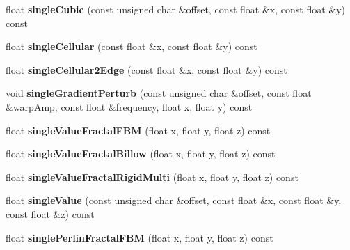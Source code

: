 \begin{DoxyCompactItemize}
\item 
\mbox{\label{classnoisefast_afbbb7524b3ad1ed5a73151118eda2a15}} 
float {\bfseries single\+Cubic} (const unsigned char \&offset, const float \&x, const float \&y) const
\item 
\mbox{\label{classnoisefast_a4ed28a5a64f23391bf7fc47a4e5c9406}} 
float {\bfseries single\+Cellular} (const float \&x, const float \&y) const
\item 
\mbox{\label{classnoisefast_a880c63b975569479b02e7a55e5c5abe5}} 
float {\bfseries single\+Cellular2\+Edge} (const float \&x, const float \&y) const
\item 
\mbox{\label{classnoisefast_ac940409687731590ca85d2a332ab571f}} 
void {\bfseries single\+Gradient\+Perturb} (const unsigned char \&offset, const float \&warp\+Amp, const float \&frequency, float x, float y) const
\item 
\mbox{\label{classnoisefast_a88653a808979753ae72ab4ef381f0c38}} 
float {\bfseries single\+Value\+Fractal\+F\+BM} (float x, float y, float z) const
\item 
\mbox{\label{classnoisefast_a1285f5ef689b8f554bbbf304e565dad2}} 
float {\bfseries single\+Value\+Fractal\+Billow} (float x, float y, float z) const
\item 
\mbox{\label{classnoisefast_af8271af4a3394316c42fc0db3f26ed74}} 
float {\bfseries single\+Value\+Fractal\+Rigid\+Multi} (float x, float y, float z) const
\item 
\mbox{\label{classnoisefast_a14a53e242b826300afd9f682310bd8d4}} 
float {\bfseries single\+Value} (const unsigned char \&offset, const float \&x, const float \&y, const float \&z) const
\item 
\mbox{\label{classnoisefast_a7291bd235574ba6950afbe1d1c2d47dd}} 
float {\bfseries single\+Perlin\+Fractal\+F\+BM} (float x, float y, float z) const
\item 
\mbox{\label{classnoisefast_ad77ae9b3b52e9c643aeeaee58542502b}} 

\end{DoxyCompactItemize}
